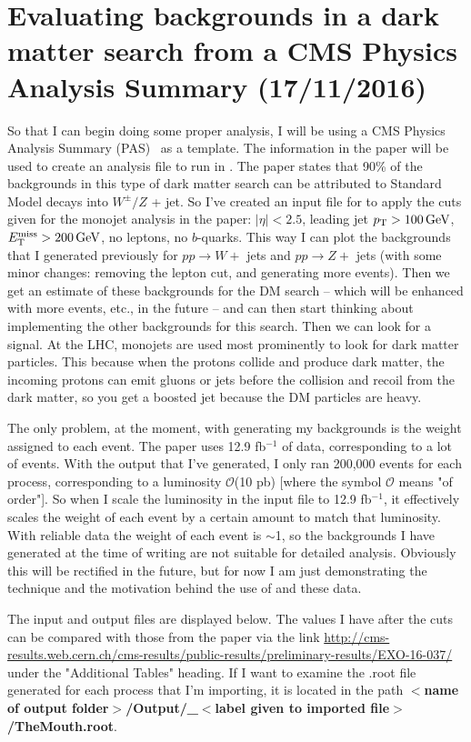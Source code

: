 
\chapter{Evaluating backgrounds in a dark matter search from a CMS Physics Analysis Summary (17/11/2016)}

So that I can begin doing some proper analysis, I will be using a CMS Physics Analysis Summary (PAS)~\cite{CMS:2016pod} as a template. The information in the paper will be used to create an analysis file to run in \madanalysis. The paper states that 90\% of the backgrounds in this type of dark matter search can be attributed to Standard Model decays into $W^{\pm} / Z$ + jet. So I've created an input file for \madanalysis to apply the cuts given for the monojet analysis in the paper: $|\eta| < 2.5$, leading jet $p_{\mathrm{T}} > 100\,\text{G\text{e\kern-0.15ex V}}$, $E_{\mathrm{T}}^{\text{miss}} > 200\,\text{G\text{e\kern-0.15ex V}}$, no leptons, no $b$-quarks. This way I can plot the backgrounds that I generated previously for $pp \rightarrow W +$ jets and $pp \rightarrow Z +$ jets (with some minor changes: removing the lepton \pt cut, and generating more events). Then we get an estimate of these backgrounds for the DM search -- which will be enhanced with more events, etc., in the future -- and can then start thinking about implementing the other backgrounds for this search. Then we can look for a signal. At the LHC, monojets are used most prominently to look for dark matter particles. This because when the protons collide and produce dark matter, the incoming protons can emit gluons or jets before the collision and recoil from the dark matter, so you get a boosted jet because the DM particles are heavy.

The only problem, at the moment, with generating my backgrounds is the weight assigned to each event. The paper uses 12.9 fb$^{-1}$ of data, corresponding to a lot of events. With the \madgraph output that I've generated, I only ran 200,000 events for each process, corresponding to a luminosity $\mathcal{O}$(10 pb) [where the symbol $\mathcal{O}$ means "of order"]. So when I scale the luminosity in the \madanalysis input file to 12.9 fb$^{-1}$, it effectively scales the weight of each event by a certain amount to match that luminosity. With reliable data the weight of each event is $\sim$1, so the backgrounds I have generated at the time of writing are not suitable for detailed analysis. Obviously this will be rectified in the future, but for now I am just demonstrating the technique and the motivation behind the use of \madanalysis and these data.

The input and output files are displayed below. The values I have after the cuts can be compared with those from the paper via the link \url{http://cms-results.web.cern.ch/cms-results/public-results/preliminary-results/EXO-16-037/} under the "Additional Tables" heading. If I want to examine the .root file generated for each process that I'm importing, it is located in the path \textbf{$<$name of output folder$>$/Output/\_$<$label given to imported file$>$/TheMouth.root}.

